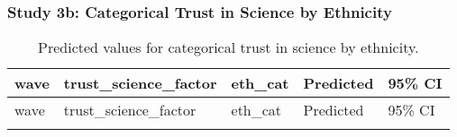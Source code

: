\documentclass[
  single column]{article}
\begin{document}
\subsubsection{Study 3b: Categorical Trust in Science by
Ethnicity}\label{study-3b-categorical-trust-in-science-by-ethnicity}

\begin{longtable}[]{@{}
  >{\raggedright\arraybackslash}p{}
  >{\raggedright\arraybackslash}p{}
  >{\raggedright\arraybackslash}p{}
  >{\raggedright\arraybackslash}p{}
  >{\raggedright\arraybackslash}p{}@{}}
\caption{Predicted values for categorical trust in science by
ethnicity.}\label{tbl-science-eth}\tabularnewline
\toprule\noalign{}
\begin{minipage}[b]{\linewidth}\raggedright
wave
\end{minipage} & \begin{minipage}[b]{\linewidth}\raggedright
trust\_science\_factor
\end{minipage} & \begin{minipage}[b]{\linewidth}\raggedright
eth\_cat
\end{minipage} & \begin{minipage}[b]{\linewidth}\raggedright
Predicted
\end{minipage} & \begin{minipage}[b]{\linewidth}\raggedright
95\% CI
\end{minipage} \\
\midrule\noalign{}
\endfirsthead
\toprule\noalign{}
\begin{minipage}[b]{\linewidth}\raggedright
wave
\end{minipage} & \begin{minipage}[b]{\linewidth}\raggedright
trust\_science\_factor
\end{minipage} & \begin{minipage}[b]{\linewidth}\raggedright
eth\_cat
\end{minipage} & \begin{minipage}[b]{\linewidth}\raggedright
Predicted
\end{minipage} & \begin{minipage}[b]{\linewidth}\raggedright
95\% CI
\end{minipage} \\
\midrule\noalign{}
\endhead
\bottomrule\noalign{}

\end{longtable}
\end{document}
